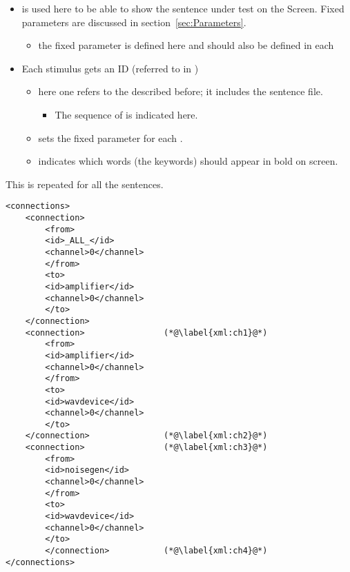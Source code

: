 \begin{itemize}
\item {} is used here to be able to show
the sentence under test on the Screen. Fixed parameters are
discussed in section~\ref{sec:Parameters}.


\begin{itemize}
\item {} the fixed parameter is defined here and
should also be defined in each 
\end{itemize}

\item {} Each stimulus gets an ID (referred to in
)
\begin{itemize}

\item {} here one refers to the
 described before; it includes the sentence
file.

\begin{itemize}
\item {} The sequence of  is
indicated here.
\end{itemize}

\item {} sets the fixed parameter for each
.

\item {} indicates which words (the keywords) should
appear in bold on screen.
\end{itemize}
\end{itemize}

This is repeated for all the sentences.










\begin{lstlisting}
<connections>
    <connection>
        <from>
        <id>_ALL_</id>
        <channel>0</channel>
        </from>
        <to>
        <id>amplifier</id>
        <channel>0</channel>
        </to>
    </connection>
    <connection>                (*@\label{xml:ch1}@*)
        <from>
        <id>amplifier</id>
        <channel>0</channel>
        </from>
        <to>
        <id>wavdevice</id>
        <channel>0</channel>
        </to>
    </connection>               (*@\label{xml:ch2}@*)
    <connection>                (*@\label{xml:ch3}@*)
        <from>
        <id>noisegen</id>
        <channel>0</channel>
        </from>
        <to>
        <id>wavdevice</id>
        <channel>0</channel>
        </to>
        </connection>           (*@\label{xml:ch4}@*)
</connections>
\end{lstlisting}

